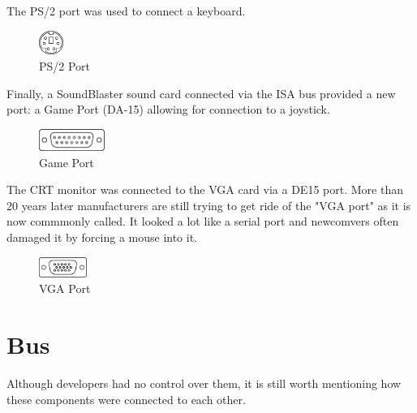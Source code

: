 \documentclass[book.tex]{subfiles}
\begin{document}
The PS/2 port was used to connect a keyboard.
 \begin{figure}[H]
\centering
\includegraphics[width=0.07\textwidth]{imgs/drawings/ports/MiniDIN-6_PS2.eps}
\caption{PS/2 Port}
\label{fig:ps2Port}
\end{figure}


Finally, a SoundBlaster sound card connected via the ISA bus provided a new port: a Game Port (DA-15) allowing for connection to a joystick.
 \begin{figure}[H]
\centering
\includegraphics[width=0.19\textwidth]{imgs/drawings/ports/DA-15_GamePort.eps}
\caption{Game Port}
\label{fig:gamePort}
\end{figure}

 The CRT monitor was connected to the VGA card via a DE15 port. More than 20 years later manufacturers are still trying to get ride of the "VGA port" as it is now commmonly called. It looked a lot like a serial port and newcomvers often damaged it by forcing a mouse into it.
 \begin{figure}[H]
\centering
\includegraphics[width=0.14\textwidth]{imgs/drawings/DE15_VGA.eps}
\caption{VGA Port}
\label{fig:ps2Port}
\end{figure}


\section{Bus}
Although developers had no control over them, it is still worth mentioning how these components were connected to each other.\\ 
\par
\end{document}
